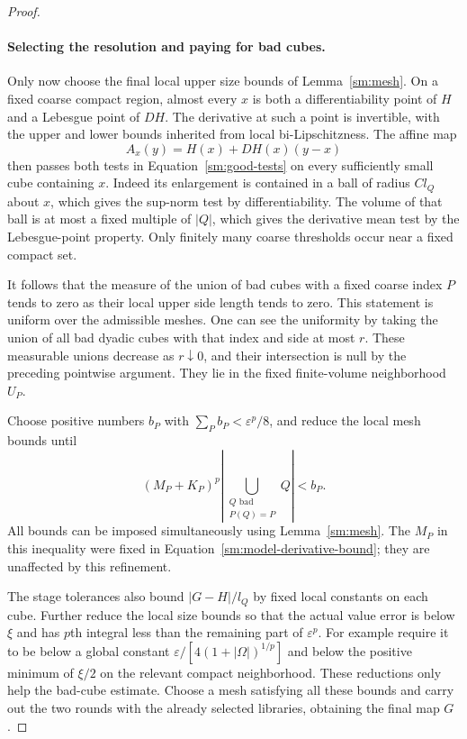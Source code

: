 \documentclass[11pt]{article}
\numberwithin{equation}{section}
\theoremstyle{definition}
\theoremstyle{remark}
\newcommand{\eps}{\varepsilon}
\begin{document}
\begin{proof}
\paragraph{Selecting the resolution and paying for bad cubes.}
Only now choose the final local upper size
bounds of Lemma~\ref{sm:mesh}.  On a fixed
coarse compact region, almost every $x$ is
both a differentiability point of $H$ and a
Lebesgue point of $DH$.  The derivative at
such a point is invertible, with the upper
and lower bounds inherited from local
bi-Lipschitzness.  The affine map
\[
 A_x(y)=H(x)+DH(x)(y-x)
\]
then passes both tests in
Equation~\eqref{sm:good-tests} on every sufficiently
small cube containing $x$.  Indeed its
enlargement is contained in a ball of radius
$C l_Q$ about $x$, which gives the sup-norm
test by differentiability.  The volume of
that ball is at most a fixed multiple of
$|Q|$, which gives the derivative mean test
by the Lebesgue-point property.  Only
finitely many coarse thresholds occur near
a fixed compact set.

It follows that the measure of the union of
bad cubes with a fixed coarse index $P$
tends to zero as their local upper side
length tends to zero.  This statement is
uniform over the admissible meshes.  One
can see the uniformity by taking the union
of all bad dyadic cubes with that index
and side at most $r$.  These measurable
unions decrease as $r\downarrow0$, and
their intersection is null by the preceding
pointwise argument.  They lie in the fixed
finite-volume neighborhood $U_P$.

Choose positive numbers $b_P$ with
$\sum_Pb_P<\eps^p/8$, and reduce the
local mesh bounds until
\begin{equation}
 \label{sm:bad-error-budget}
 (M_P+K_P)^p
 \left|\bigcup_{\substack{Q\text{ bad}\\P(Q)=P}}Q\right|
 <b_P.
\end{equation}
All bounds can be imposed simultaneously
using Lemma~\ref{sm:mesh}.  The $M_P$ in
this inequality were fixed in
Equation~\eqref{sm:model-derivative-bound}; they
are unaffected by this refinement.

The stage tolerances also bound
$|G-H|/l_Q$ by fixed local constants
on each cube.  Further reduce the
local size bounds so that the actual
value error is below $\xi$ and has
$p$th integral less than the remaining
part of $\eps^p$.  For example require
it to be below a global constant
$\eps/[4(1+|\Omega|)^{1/p}]$ and below
the positive minimum of $\xi/2$ on
the relevant compact neighborhood.
These reductions only help the bad-cube
estimate.  Choose a mesh satisfying all these bounds and carry
out the two rounds with the already selected libraries, obtaining
the final map $G$.


\end{proof}
\end{document}
